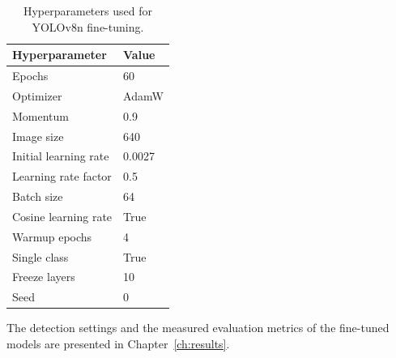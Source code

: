 \begin{table}[h]
        \caption{Hyperparameters used for YOLOv8n fine-tuning.}
    \label{tab:yolo_hyperparameters}
    \centering
    \begin{tabular}{|p{}|p{}|}
    \hline
    \textbf{Hyperparameter} & \textbf{Value} \\
    \hline
    Epochs & 60 \\
    \hline
    Optimizer & AdamW \\
    \hline
    Momentum & 0.9 \\
    \hline
    Image size & 640 \\
    \hline
    Initial learning rate & 0.0027 \\
    \hline
    Learning rate factor & 0.5 \\
    \hline
    Batch size & 64 \\
    \hline
    Cosine learning rate & True \\
    \hline
    Warmup epochs & 4 \\
    \hline
    Single class & True \\
    \hline
    Freeze layers & 10 \\
    \hline
    Seed & 0 \\
    \hline
    \end{tabular}
\end{table}

The detection settings and the measured evaluation metrics of the fine-tuned models are presented in Chapter~\ref{ch:results}.




